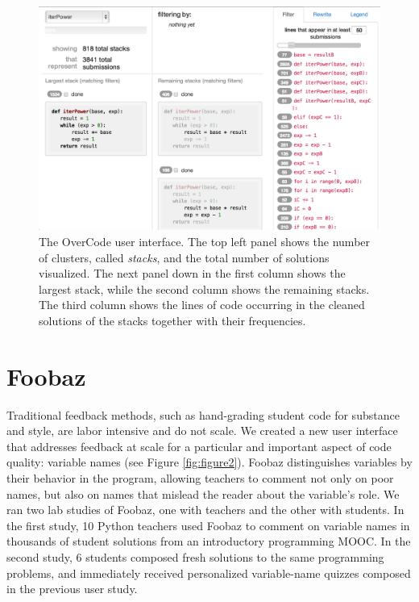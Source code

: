 \begin{figure}
\centering
\includegraphics[width=1.0\linewidth]{Body/figures/interfaceScreenShot.png}
\caption{The OverCode user interface. The top left panel shows the number of clusters, called {\it stacks}, and the total number of solutions visualized. The next panel down in the first column shows the largest stack, while the second column shows the remaining stacks. The third column shows the lines of code occurring in the cleaned solutions of the stacks together with their frequencies.}
\label{fullinterface}
\end{figure}


\section{Foobaz}

Traditional feedback methods, such as hand-grading student code for substance and style, are labor intensive and do not scale. We created a new user interface that addresses feedback at scale for a particular and important aspect of code quality: variable names (see Figure \ref{fig:figure2}). Foobaz distinguishes variables by their behavior in the program, allowing teachers to comment not only on poor names, but also on names that mislead the reader about the variable's role. We ran two lab studies of Foobaz, one with teachers and the other with students. In the first study, 10 Python teachers used Foobaz to comment on variable names in thousands of student solutions from an introductory programming MOOC. In the second study, 6 students composed fresh solutions to the same programming problems, and immediately received personalized variable-name quizzes composed in the previous user study.

